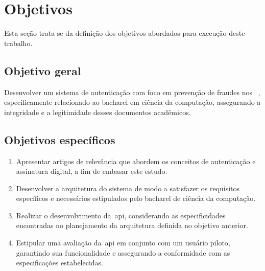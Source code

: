 \section{Objetivos}\label{sec:objetivos}

Esta seção trata-se da definição dos objetivos abordados para
execução deste trabalho.
\subsection{Objetivo geral}\label{subsec:objetivo-geral}

Desenvolver um sistema de autenticação com foco em prevenção de fraudes nos
~, especificamente relacionado ao bacharel em ciência da computação,
assegurando a integridade e a legitimidade desses documentos acadêmicos.
\subsection{Objetivos específicos}\label{subsec:objetivos-especificos}

\newcommand{\buscaReferencia}{
    Apresentar artigos de relevância que abordem os conceitos de autenticação e
    assinatura digital, a fim de embasar este estudo.
}

\newcommand{\arquitetura}{
    Desenvolver a arquitetura do sistema de modo a satisfazer os requisitos
    específicos e necessários estipulados pelo bacharel de ciência da computação.
}

\newcommand{\implementacao}{
    Realizar o desenvolvimento da~\acrshort{api}, considerando as especificidades
    encontradas no planejamento da arquitetura definida no objetivo anterior.
}

\newcommand{\testes}{
    Estipular uma avaliação da~\acrshort{api} em conjunto com um usuário piloto,
    garantindo sua funcionalidade e assegurando a conformidade com as
    especificações estabelecidas.
}

\begin{enumerate}[label=\alph*)]
    \item  \buscaReferencia
    \item  \arquitetura
    \item  \implementacao
    \item  \testes
\end{enumerate}